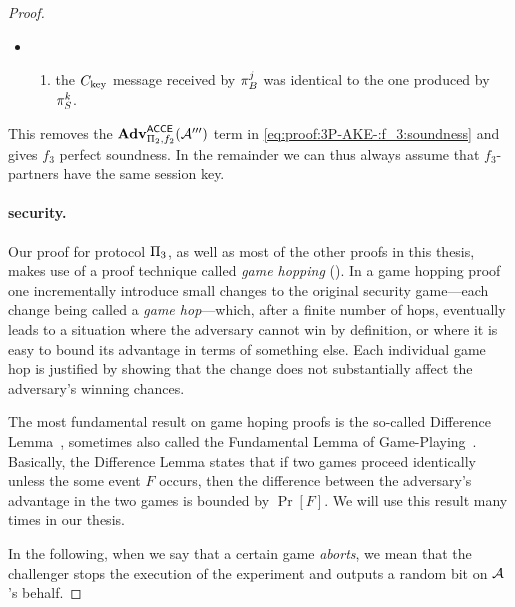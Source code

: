 \begin{proof}
\begin{itemize}
	\item[]
\begin{enumerate}[4.]
	\item 	the $C_{\mathrm{key}}$ message received by $\oracle[B][j]$ was identical to the one produced by~$\oracle[S][k]$.
\end{enumerate}
\end{itemize}
	

This removes the $\mathbf{Adv}_{\mathrm{\Pi}_2,f_2}^{\mathsf{ACCE}}(\mathcal{A}''')$ term in \cref{eq:proof:3P-AKE-:f_3:soundness} and gives $f_3$ perfect soundness.
In the remainder we can thus always assume that $f_3$-partners have the same session key.
		



\paragraph{\texorpdfstring{\akewfstext}{AKEwfs} security.}
Our proof for protocol $\mathrm{\Pi}_3$,
as well as most of the other proofs in this thesis,
makes use of a proof technique called \emph{game hopping} (\cite{EPRINT:Shoup04,EPRINT:BelRog04}).
In a game hopping proof
one incrementally  introduce small changes to the original security game---each change being called a \emph{game hop}---which,
after a finite number of hops,
eventually leads to a situation where the adversary cannot win by definition,
or where it is easy to bound its advantage in terms of something else.
Each individual game hop is justified by showing that the change does not substantially affect the adversary's winning chances.

The most fundamental result on game hoping proofs is the so-called Difference Lemma~\cite{EPRINT:Shoup04},
sometimes also called the Fundamental Lemma of Game-Playing~\cite{EPRINT:BelRog04}.
Basically,
the Difference Lemma states that if two games proceed identically unless the some event $F$ occurs,
then the difference between the adversary's advantage in the two games is bounded by $\Pr[F]$.
We will use this result many times in our thesis.



In the following,
when we say that a certain game \emph{aborts}, 
we mean that the challenger stops the execution of the experiment and outputs a random bit on $\mathcal{A}$'s behalf. 



\end{proof}

